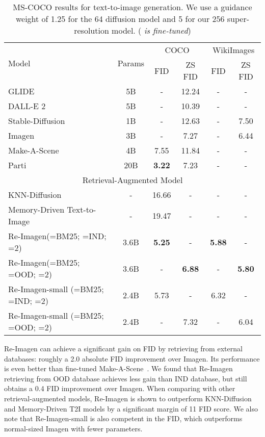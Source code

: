 \documentclass{article} \usepackage{iclr2023_conference,times}
\newcommand{\modelname}{{Re-Imagen}\xspace}
\newcommand{\pd}{\hphantom{.}}
\newcommand{\pz}{\hphantom{0}}
\begin{document}
\begin{table}[!t]
    \small
    \centering
    \begin{tabular}{lc|cc|cc}
        \toprule
        \multirow{2}{*}{Model}      & \multirow{2}{*}{Params} & \multicolumn{2}{c|}{COCO} & \multicolumn{2}{c}{WikiImages} \\
         &  & FID & ZS FID & FID & ZS FID \\
        \midrule
        GLIDE~\citep{nichol2021glide} & \pz\pd5B & - & 12.24 & - & -  \\
        DALL-E 2~\citep{ramesh2022hierarchical} & 5B & - & 10.39 & - & - \\
Stable-Diffusion~\citep{rombach2022high} & \pd\pz1B & - & 12.63 & - & 7.50  \\
        Imagen~\citep{saharia2022photorealistic} & \pd\pz3B  & - & \pz7.27 & - & 6.44  \\
        Make-A-Scene~\citep{gafni2022make} & \pd\pz4B  &  7.55 & 11.84 & - & -  \\
        Parti~\citep{yu2022scaling} & \pd20B  & \textbf{3.22} & \pz7.23 & - & - \\
        \midrule
        \multicolumn{6}{c}{Retrieval-Augmented Model}  \\
        \midrule
        KNN-Diffusion~\citep{ashual2022knn} & - & 16.66 & - & - & -  \\
        Memory-Driven Text-to-Image~\citep{li2022memory} & - & 19.47 & - & - & - \\
        \midrule
        \modelname (=BM25; =IND; =2) & 3.6B & \textbf{5.25} & -  & \textbf{5.88} & -\\
        \modelname (=BM25; =OOD; =2) & 3.6B & - & \pz \textbf{6.88}  & -  &  \textbf{5.80} \\
        \modelname-small (=BM25; =IND; =2) & 2.4B & 5.73 & - & 6.32 & - \\
        \modelname-small (=BM25; =OOD; =2) & 2.4B & - & \pz 7.32 & - & 6.04 \\
\bottomrule
    \end{tabular}
    \caption{MS-COCO results for text-to-image generation. We use a guidance weight of 1.25 for the 64 diffusion model and 5 for our 256 super-resolution model. ( \textit{is fine-tuned})}
    \label{tab:coco}
    \vspace{-3ex}
\end{table}

\modelname can achieve a significant gain on FID by retrieving from external databases: roughly a 2.0 absolute FID improvement over Imagen. Its performance is even better than fine-tuned Make-A-Scene~\citep{gafni2022make}. We found that \modelname retrieving from OOD database achieves less gain than IND database, but still obtains a 0.4 FID improvement over Imagen. When comparing with other retrieval-augmented models, \modelname is shown to outperform KNN-Diffusion and Memory-Driven T2I models by a significant margin of 11 FID score. We also note that \modelname-small is also competent in the FID, which outperforms normal-sized Imagen with fewer parameters.
\end{document}
